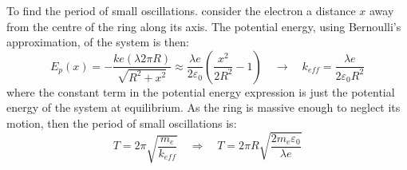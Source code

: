 \begin{description}[leftmargin=!, labelwidth=\widthof{$\bullet$}]
	To find the period of small oscillations. consider the electron a distance $x$ away from the centre of the ring along its axis. The potential energy, using Bernoulli's approximation, of the system is then:
	\begin{equation*}
		E_p(x) = - \frac{
			ke (\lambda 2 \pi R)
		}{\sqrt{R^2 + x^2}}
		\approx
		\frac{\lambda e}{2 \varepsilon_0}
		\left(
		\frac{x^2}{2R^2} - 1
		\right)
		\quad\rightarrow\quad
		\boxed{k_{eff} = \frac{\lambda e}{2\varepsilon_0 R^2}}
		\tag{$*$}
		\label{eq:j17_p5_mock1}
	\end{equation*}
	where the constant term in the potential energy expression is just the potential energy of the system at equilibrium. As the ring is massive enough to neglect its motion, then the period of small oscillations is:
	\begin{equation*}
		T = 2 \pi \sqrt{\frac{m_e}{k_{eff}}}
		\quad\Rightarrow\quad
		\boxed{T = 2 \pi R \sqrt{\frac{2 m_e \varepsilon_0}{\lambda e}}}
		\tag{$3$}
		\label{eq:j17_p5_3}
	\end{equation*}
\end{description}

